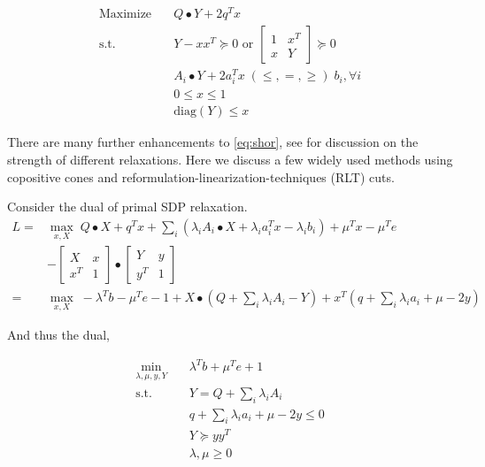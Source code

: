 \documentclass[../main]{subfiles}
\begin{document}
\begin{equation}\label{eq:shor}
  \begin{aligned}
    \mathrm{Maximize}\quad & Q\bullet Y   + 2q^T x                                            \\
    \mathrm{s.t.}  \quad   & Y-xx^T \succeq 0 \text { or }\begin{bmatrix} 1 & x^{T} \\ x & Y \end{bmatrix} \succeq 0 \\
                           & A_i \bullet Y +2 a_i^Tx \; (\le, =, \ge) \; b_i, \forall i       \\
                           & 0\le x\le 1                                                      \\
                           & \mathrm{diag}(Y) \le x
  \end{aligned}
\end{equation}

There are many further enhancements to \eqref{eq:shor}, see \cite{bao_semidefinite_2011} for discussion on the strength of different relaxations. Here we discuss a few widely used methods using copositive cones and reformulation-linearization-techniques (RLT) cuts.


Consider the dual of primal SDP relaxation.
\begin{equation}
  \begin{aligned}
    L = & \max_{x, X} \; Q\bullet X + q^Tx + \sum_i \left( \lambda_i A_i \bullet X  + \lambda_i a_i^Tx - \lambda_i b_i \right ) + \mu^Tx - \mu^Te \\
        & - \begin{bmatrix}X & x \\ x^T & 1\end{bmatrix} \bullet \begin{bmatrix}Y & y \\ y^T & 1\end{bmatrix}                                                                         \\
    =   & \max_{x, X} \; - \lambda^Tb - \mu^Te - 1+X\bullet (Q + \sum_i\lambda_iA_i - Y) + x^T(q + \sum_i \lambda_i a_i + \mu - 2 y)
  \end{aligned}
\end{equation}

And thus the dual,

\begin{equation}
  \begin{aligned}
    \min_{\lambda, \mu, y, Y}\quad & \lambda^Tb + \mu^Te + 1                    \\
    \mathrm{s.t.} \quad            & Y = Q + \sum_i \lambda_i A_i               \\
                                   & q + \sum_i \lambda_i a_i + \mu - 2 y \le 0 \\
                                   & Y \succeq yy^T                             \\
                                   & \lambda, \mu \ge 0
  \end{aligned}
\end{equation}
\end{document}
